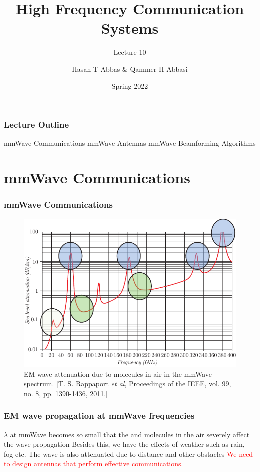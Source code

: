 \documentclass[10pt]{beamer}
\title{High Frequency Communication Systems}
\subtitle{Lecture 10}
\date{Spring 2022}
\author{Hasan T Abbas \& Qammer H Abbasi}
\begin{document}
\maketitle

\begin{frame}[fragile]
    \frametitle{Lecture Outline}
    \begin{outline}[itemize]
        \1 mmWave Communications
        \1 mmWave Antennas
        \1 mmWave Beamforming Algorithms
    \end{outline}
\end{frame}

\section{mmWave Communications}


\begin{frame}
    \frametitle{mmWave Communications}

    \begin{figure}[h!]
        \centering
        \includegraphics[width=.9\textwidth]{atmosphere.pdf}
        \caption{EM wave attenuation due to  molecules in air in the mmWave spectrum. \tiny{[T. S. Rappaport \textit{et al},  Proceedings of the IEEE, vol. 99, no. 8, pp. 1390-1436, 2011.]}}
    \end{figure}

\end{frame}

\begin{frame}
    \frametitle{EM wave propagation at mmWave frequencies}
    \normalsize
    \begin{outline}
        \1 $\lambda$ at mmWave becomes so small that the  and  molecules in the air severely affect the wave propagation
        \1 Besides this, we have the effects of weather such as rain, fog etc.
        \2 The wave is also attenuated due to distance and other obstacles
        \1 \textcolor{red}{We need to design antennas that perform effective communications.}
    \end{outline}
\end{frame}
\end{document}
